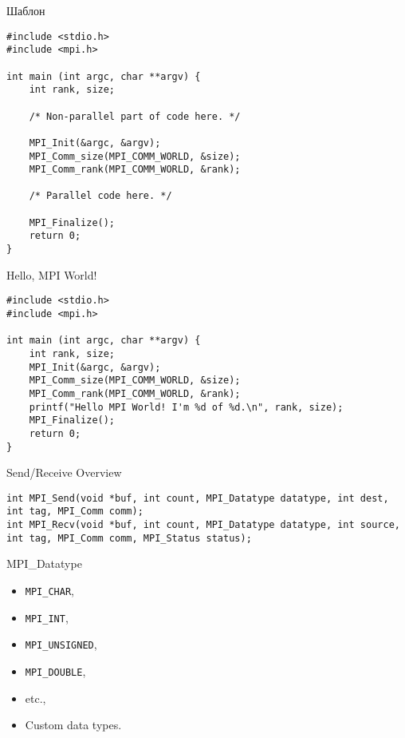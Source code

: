 \begin{frame}[fragile]{Шаблон}
\begin{lstlisting}[basicstyle=\scriptsize]
#include <stdio.h>
#include <mpi.h>

int main (int argc, char **argv) {
    int rank, size;

    /* Non-parallel part of code here. */

    MPI_Init(&argc, &argv);
    MPI_Comm_size(MPI_COMM_WORLD, &size);
    MPI_Comm_rank(MPI_COMM_WORLD, &rank);

    /* Parallel code here. */

    MPI_Finalize();
    return 0;
}
\end{lstlisting}
\end{frame}

\begin{frame}[fragile]{Hello, MPI World!}
\begin{lstlisting}[basicstyle=\scriptsize]
#include <stdio.h>
#include <mpi.h>

int main (int argc, char **argv) {
    int rank, size;
    MPI_Init(&argc, &argv);
    MPI_Comm_size(MPI_COMM_WORLD, &size);
    MPI_Comm_rank(MPI_COMM_WORLD, &rank);
    printf("Hello MPI World! I'm %d of %d.\n", rank, size);
    MPI_Finalize();
    return 0;
}
\end{lstlisting}
\end{frame}

\begin{frame}[fragile]{Send/Receive Overview}

\begin{lstlisting}
int MPI_Send(void *buf, int count, MPI_Datatype datatype, int dest, int tag, MPI_Comm comm);
int MPI_Recv(void *buf, int count, MPI_Datatype datatype, int source, int tag, MPI_Comm comm, MPI_Status status);
\end{lstlisting}

\end{frame}

\begin{frame}{MPI_Datatype}

\begin{itemize}
    \item \texttt{MPI_CHAR},
    \item \texttt{MPI_INT},
    \item \texttt{MPI_UNSIGNED},
    \item \texttt{MPI_DOUBLE},
    \item etc.,
    \item Custom data types.
\end{itemize}

\end{frame}

